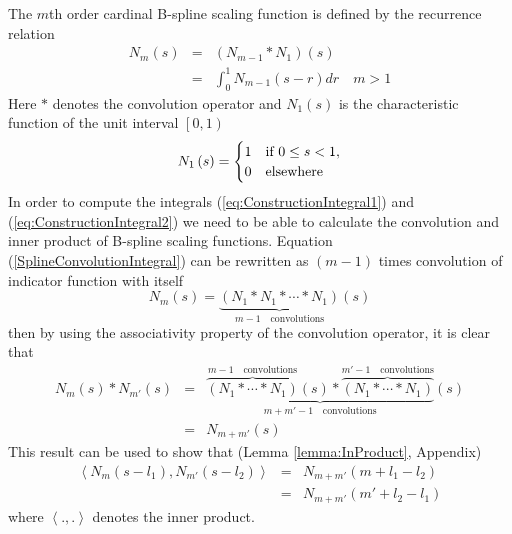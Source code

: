 \documentclass[journal,a4paper]{IEEEtran}
\begin{document}
The  $m$th order cardinal B-spline scaling function is defined by the recurrence relation \cite{Chui1992} 
\begin{eqnarray}
N_{m}\left(s\right)&=&\left(N_{m-1}\ast N_{1}\right)\left(s\right)\nonumber \\
&=&\int_0^{1} N_{m-1}\left( s-r\right)dr \quad m>1 
\label{SplineConvolutionIntegral}
\end{eqnarray}
Here $\ast$ denotes the convolution operator and $N_1\left(s\right)$ is the characteristic function of the unit interval  $\left[ 0,1\right) $
\begin{equation}
N_{1}\left(s\right)=
\begin{cases}
1 & \text{if $ 0\le s<1$}, \\
0 & \mathrm{elsewhere}
\end{cases}
\end{equation}
In order to compute the  integrals (\ref{eq:ConstructionIntegral1}) and (\ref{eq:ConstructionIntegral2}) we need to be able to calculate the convolution and inner product of B-spline scaling functions. Equation (\ref{SplineConvolutionIntegral}) can be rewritten as $(m-1)$ times convolution of indicator function with itself 
\begin{equation}
 N_{m}\left(s\right)=\underbrace{\left(N_{1}\ast N_{1}\ast \cdots \ast N_{1}\right)}_{m-1\quad \text{convolutions}}\left(s\right)
\end{equation}
then by using the associativity property of the convolution operator, it is clear that
\setlength{\arraycolsep}{0.0em}
\begin{eqnarray}
N_{m}\left(s\right) \ast N_{m'}\left(s\right)&=&\underbrace{\overbrace{\left(N_{1} \ast \cdots \ast N_{1}\right)}^{m-1 \quad \text{convolutions}}\left(s\right) \ast \overbrace{\left(N_{1} \ast \cdots \ast N_{1}\right)}^{m'-1\quad \text{convolutions}}}_{m+m'-1 \quad \text{convolutions}}\left(s\right)\nonumber\\
&=&N_{m+m'}\left(s\right)
\label{eq:BsplineConvolution}
\end{eqnarray}
\setlength{\arraycolsep}{5pt}
This result can be used to show that (Lemma \ref{lemma:InProduct}, Appendix)
\setlength{\arraycolsep}{0.0em}
\begin{eqnarray}
 \left\langle N_{m}\left(s-l_{1}\right), N_{m'}\left(s-l_{2}\right)\right\rangle&=&N_{m+m'}\left(m+l_{1}-l_{2}\right)\nonumber \\
&=&N_{m+m'}\left(m'+l_{2}-l_{1}\right)
\label{eq:BsplineInnerProduct}
\end{eqnarray}
\setlength{\arraycolsep}{5pt}
where $\left\langle  .,.\right\rangle $ denotes the inner product.
\end{document}
